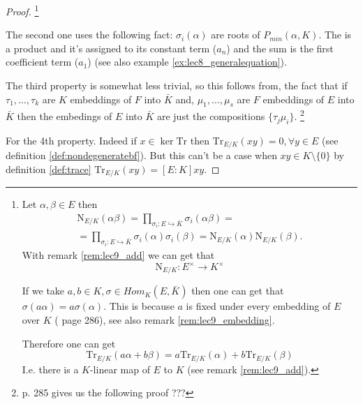 \begin{property}
\begin{proof}
    \footnote{
      Let $\alpha, \beta \in E$ then
      \begin{eqnarray}
        \mathrm{N}_{E/K}\left(\alpha \beta\right) =
          \prod_{\sigma_i: E \hookrightarrow \bar{K}}
          \sigma_i\left(\alpha \beta\right) =
          \nonumber \\
          =
          \prod_{\sigma_i: E \hookrightarrow \bar{K}}
          \sigma_i\left(\alpha\right)
          \sigma_i\left(\beta\right) 
          =
          \mathrm{N}_{E/K}\left(\alpha\right)
          \mathrm{N}_{E/K}\left(\beta\right).
        \nonumber
      \end{eqnarray}
      With remark \ref{rem:lec9_add} we can get that
      \[
      \mathrm{N}_{E/K}: E^\times \to K^\times
      \]

      If we take $a,b \in K, \sigma \in Hom_K\left(E, \bar{K}\right)$
      then one can get that
      $\sigma\left(a \alpha\right) = a
      \sigma\left(\alpha\right)$. This is because $a$ is fixed under
      every embedding of $E$ over $K$ (\cite{bib:lang} page 286), see
      also remark \ref{rem:lec9_embedding}.
      
      Therefore one can get
      \[
      \mathrm{Tr}_{E/K}\left(a \alpha + b \beta\right)=
      a \mathrm{Tr}_{E/K}\left(\alpha\right) +
      b \mathrm{Tr}_{E/K}\left(\beta\right)
      \]
      I.e. there is a $K$-linear map of $E$ to $K$
      (see remark \ref{rem:lec9_add}).
    }

    The second one uses the following fact:
    $\sigma_i\left(\alpha\right)$ are roots of $P_{min}\left(\alpha,
    K\right)$. The  is a product and it's assigned
    to its constant term ($a_n$) and the sum is the first coefficient 
    term ($a_1$) (see also example \ref{ex:lec8_generalequation}).

    The third property is somewhat less trivial, so this follows from,
    the fact that if $\tau_1, \dots, \tau_k$ are $K$ embeddings of $F$
    into $\bar{K}$ and, $\mu_1, \dots, \mu_s$ are $F$ embeddings of
    $E$ into $\bar{K}$ then the embedings of $E$ into $\bar{K}$ are
    just the compositions $\{\tau_j \mu_i\}$.
    \footnote{
      \cite{bib:lang} p. 285 gives us the following proof ???
    }

    For the 4th property. Indeed if $x \in \ker \mathrm{Tr}$ then
    $\mathrm{Tr}_{E/K}\left(xy\right) = 0, \forall y \in E$ (see
    definition \ref{def:nondegeneratebf}). But this
    can't be a case when $xy \in K \setminus \{0\}$ by definition
    \ref{def:trace} $\mathrm{Tr}_{E/K}\left(xy\right) =
    \left[E:K\right] xy$.


\end{proof}
\end{property}
